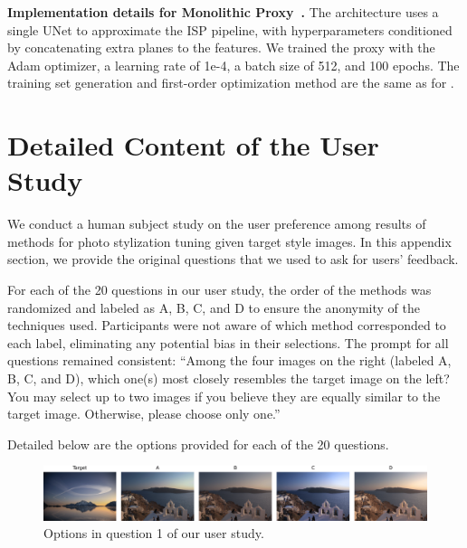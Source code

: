 \noindent\textbf{Implementation details for Monolithic Proxy~\cite{tseng2019hyperparameter}.} 
The architecture uses a single UNet to approximate the ISP pipeline, with hyperparameters conditioned by concatenating extra planes to the features. We trained the proxy with the Adam optimizer, a learning rate of 1e-4, a batch size of 512, and 100 epochs.
The training set generation and first-order optimization method are the same as for \cite{tseng2022neural}.







\section{Detailed Content of the User Study}
\label{sec:sup-user-study}
We conduct a human subject study on the user preference among results of methods for photo stylization tuning given target style images. In this appendix section, we provide the original questions that we used to ask for users' feedback.

For each of the 20 questions in our user study, the order of the methods was randomized and labeled as A, B, C, and D to ensure the anonymity of the techniques used. Participants were not aware of which method corresponded to each label, eliminating any potential bias in their selections. The prompt for all questions remained consistent: ``Among the four images on the right (labeled A, B, C, and D), which one(s) most closely resembles the target image on the left? You may select up to two images if you believe they are equally similar to the target image. Otherwise, please choose only one.''

Detailed below are the options provided for each of the 20 questions.


\begin{figure}[ht]
    \centering
    \includegraphics[width=1\linewidth]{figures/user_study/question_1.png}
    \caption{Options in question 1 of our user study.}
    \label{fig:appendix-user-study-q1}
\end{figure}

